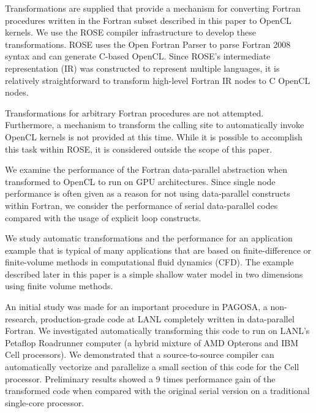 Transformations are supplied that provide a mechanism for converting
Fortran procedures written in the Fortran subset described in this
paper to OpenCL kernels.  We use the ROSE compiler infrastructure
\cite{rose-web} to develop these transformations.  ROSE uses the Open
Fortran Parser \cite{ofp:sf} to parse Fortran 2008 syntax and can
generate C-based OpenCL.  Since ROSE's intermediate representation
(IR) was constructed to represent multiple languages, it is relatively
straightforward to transform high-level Fortran IR nodes to C OpenCL
nodes.


Transformations for arbitrary Fortran procedures are not attempted.
Furthermore, a mechanism to transform the calling site to
automatically invoke OpenCL kernels is not provided at this time.
While it is possible to accomplish this task within ROSE, it is
considered outside the scope of this paper.

We examine the performance of the Fortran data-parallel abstraction
when transformed to OpenCL to run on GPU architectures.  Since single
node performance is often given as a reason for not using
data-parallel constructs within Fortran, we consider the performance
of serial data-parallel codes compared with the usage of explicit loop
constructs.

We study automatic transformations and the performance for an
application example that is typical of many applications that are
based on finite-difference or finite-volume methods in computational
fluid dynamics (CFD).  The example described later in this paper is a
simple shallow water model in two dimensions using finite volume
methods.

An initial study was made for an important procedure in PAGOSA, a
non-research, production-grade code at LANL completely written in
data-parallel Fortran.  We investigated automatically transforming
this code to run on LANL's Petaflop Roadrunner computer (a hybrid
mixture of AMD Opterons and IBM Cell processors).  We demonstrated that a
source-to-source compiler can automatically vectorize and parallelize
a small section of this code for the Cell processor.  Preliminary results
showed a 9 times performance gain of the transformed code when compared
with the original serial version on a traditional single-core processor.


